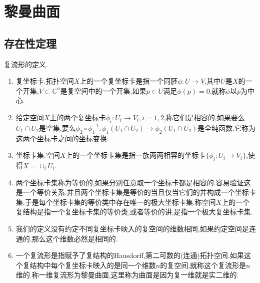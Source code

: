 \chapter{黎曼曲面}
\section{存在性定理}

复流形的定义.
\begin{enumerate}
	\item 复坐标卡.拓扑空间$X$上的一个复坐标卡是指一个同胚$\phi:U\to V$,其中$U$是$X$的一个开集,$V\subset\mathbb{C}^n$是复空间中的一个开集.如果$p\in U$满足$\phi(p)=0$,就称$\phi$以$p$为中心.
	\item 给定空间$X$上的两个复坐标卡$\phi_i:U_i\to V_i,i=1,2$,称它们是相容的,如果要么$U_1\cap U_2$是空集,要么$\phi_2\circ\phi_1^{-1}:\phi_1(U_1\cap U_2)\to\phi_2(U_1\cap U_2)$是全纯函数.它称为这两个坐标卡之间的坐标变换.
	\item 坐标卡集.空间$X$上的一个坐标卡集是指一族两两相容的坐标卡$\{\phi_i:U_i\to V_i\}$,使得$X=\cup_iU_i$.
	\item 两个坐标卡集称为等价的,如果分别任意取一个坐标卡都是相容的.容易验证这是一个等价关系.并且两个坐标卡集是等价的当且仅当它们的并构成一个坐标卡集.于是每个坐标卡集的等价类中存在唯一的极大坐标卡集.称空间$X$上的一个复结构是指一个复坐标卡集的等价类,或者等价的讲,是指一个极大复坐标卡集.
	\item 我们的定义没有约定不同复坐标卡映入的复空间的维数相同,如果约定空间是连通的,那么这个维数必然是相同的.
	\item 一个复流形是指赋予了复结构的Hausdorff,第二可数的(连通)拓扑空间.如果这个复结构中每个复坐标卡映入的是同一个维数$n$的复空间,就称这个复流形是$n$维的.称一维复流形为黎曼曲面,这里称为曲面是因为复一维就是实二维的.
\end{enumerate}

